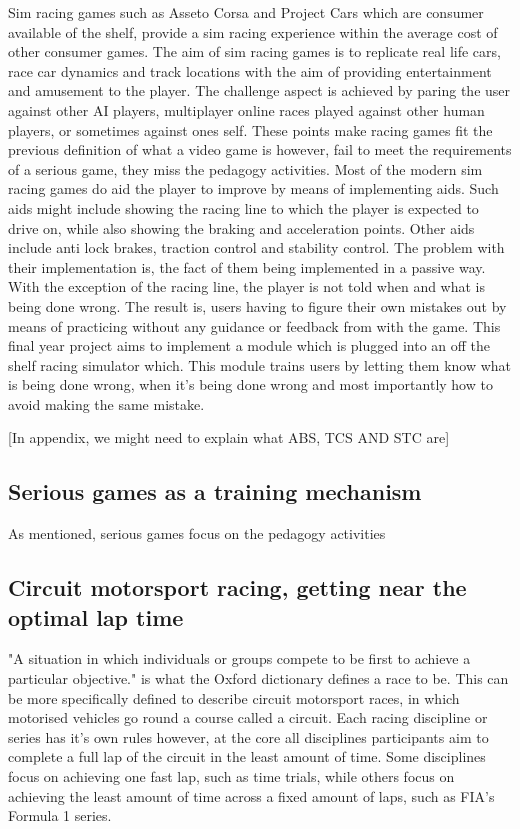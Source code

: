 \documentclass{article}
\begin{document}
Sim racing games such as Asseto Corsa and Project Cars which are consumer available of the shelf, provide a sim racing experience within the average cost of other consumer games. The aim of sim racing games is to replicate real life cars, race car dynamics and track locations with the aim of providing entertainment and amusement to the player. The challenge aspect is achieved by paring the user against other AI players, multiplayer online races played against other human players, or sometimes against ones self. These points make racing games fit the previous definition of what a video game is however, fail to meet the requirements of a serious game, they miss the pedagogy activities. Most of the modern sim racing games do aid the player to improve by means of implementing aids. Such aids might include showing the racing line to which the player is expected to drive on, while also showing the braking and acceleration points. Other aids include anti lock brakes, traction control and stability control. The problem with their implementation is, the fact of them being implemented in a passive way. With the exception of the racing line, the player is not told when and what is being done wrong. The result is, users having to figure their own mistakes out by means of practicing without any guidance or feedback from with the game. This final year project aims to implement a module which is plugged into an off the shelf racing simulator which. This module trains users by letting them know what is being done wrong, when it's being done wrong and most importantly how to avoid making the same mistake.

{\color{red}[In appendix, we might need to explain what ABS, TCS AND STC are]}

\subsection{Serious games as a training mechanism}

As mentioned, serious games focus on the pedagogy activities 

\subsection{Circuit motorsport racing, getting near the optimal lap time}

"A situation in which individuals or groups compete to be first to achieve a particular objective." is what the Oxford dictionary defines a race to be. This can be more specifically defined to describe circuit motorsport races, in which motorised vehicles go round a course called a circuit. Each racing discipline or series has it's own rules however, at the core all disciplines participants aim to complete a full lap of the circuit in the least amount of time. Some disciplines focus on achieving one fast lap, such as time trials, while others focus on achieving the least amount of time across a fixed amount of laps, such as FIA's Formula 1 series.
\end{document}
